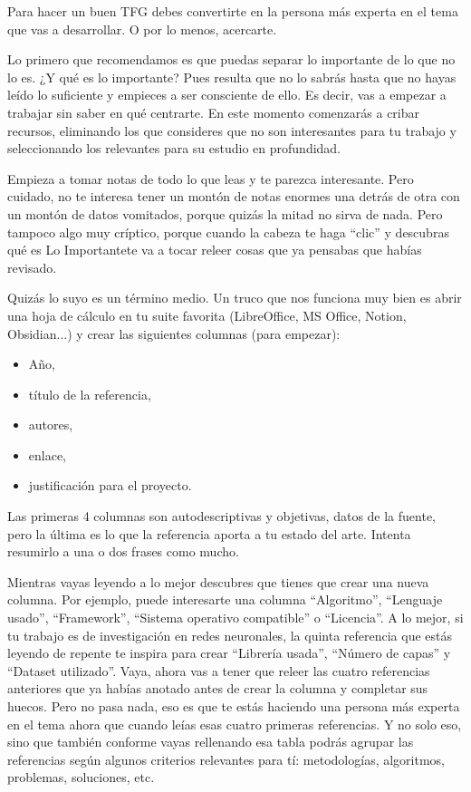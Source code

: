 Para hacer un buen TFG debes convertirte en la persona más experta en el tema que vas a desarrollar. O por lo menos, acercarte.

Lo primero que recomendamos es que puedas separar lo importante de lo que no lo es. ¿Y qué es lo importante?  Pues resulta que no lo sabrás hasta que no hayas leído lo suficiente y empieces a ser consciente de ello. Es decir, vas a empezar a trabajar sin saber en qué centrarte. En este momento comenzarás a cribar recursos, eliminando los que consideres que no son interesantes para tu trabajo y seleccionando los relevantes para su estudio en profundidad.

Empieza a tomar notas de todo lo que leas y te parezca interesante. Pero cuidado, no te interesa tener un montón de notas enormes una detrás de otra con un montón de datos vomitados, porque quizás la mitad no sirva de nada. Pero tampoco algo muy críptico, porque cuando la cabeza te haga ``clic'' y descubras qué es Lo Importante\texttrademark  te va a tocar releer cosas que ya pensabas que habías revisado. 

Quizás lo suyo es un término medio. Un truco que nos funciona muy bien es abrir una hoja de cálculo en tu suite favorita (LibreOffice, MS Office, Notion, Obsidian...) y crear las siguientes columnas (para empezar):
\begin{itemize}
    \item Año,
    \item título de la referencia,
    \item autores,
    \item enlace,
    \item justificación para el proyecto.
\end{itemize}

Las primeras 4 columnas son autodescriptivas y objetivas, datos de la fuente, pero la última es lo que la referencia aporta a tu estado del arte. Intenta resumirlo a una o dos frases como mucho.

Mientras vayas leyendo a lo mejor descubres que tienes que crear una nueva columna. Por ejemplo, puede interesarte una columna ``Algoritmo'', ``Lenguaje usado'', ``Framework'', ``Sistema operativo compatible'' o ``Licencia''. A lo mejor, si tu trabajo es de investigación en redes neuronales, la quinta referencia que estás leyendo de repente te inspira para crear ``Librería usada'', ``Número de capas'' y ``Dataset utilizado''. Vaya, ahora vas a tener que releer las cuatro referencias anteriores que ya habías anotado antes de crear la columna y completar sus huecos. Pero no pasa nada, eso es que te estás haciendo una persona más experta en el tema ahora que cuando leías esas cuatro primeras referencias. Y no solo eso, sino que también conforme vayas rellenando esa tabla podrás agrupar las referencias según algunos criterios relevantes para tí: metodologías, algoritmos, problemas, soluciones, etc.

